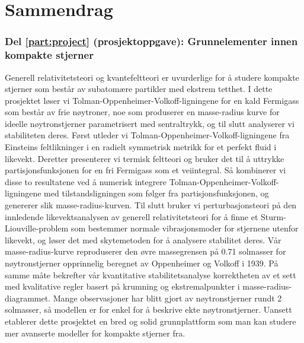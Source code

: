 \chapter*{Sammendrag}%

\subsection*{Del \ref{part:project} (prosjektoppgave): Grunnelementer innen kompakte stjerner}

Generell relativitetsteori og kvantefeltteori er uvurderlige for å studere kompakte stjerner som består av subatomære partikler med ekstrem tetthet.
I dette prosjektet løser vi Tolman-Oppenheimer-Volkoff-ligningene for en kald Fermigass som består av frie nøytroner,
noe som produserer en masse-radius kurve for ideelle nøytronstjerner parametrisert med sentraltrykk,
og til slutt analyserer vi stabiliteten deres.
Først utleder vi Tolman-Oppenheimer-Volkoff-ligningene fra Einsteins feltlikninger
i en radielt symmetrisk metrikk for et perfekt fluid i likevekt.
Deretter presenterer vi termisk feltteori og bruker det
til å uttrykke partisjonsfunksjonen for en fri Fermigass som et veiintegral.
Så kombinerer vi disse to resultatene ved å numerisk integrere Tolman-Oppenheimer-Volkoff-ligningene
med tilstandsligningen som følger fra partisjonsfunksjonen, og genererer slik masse-radius-kurven.
Til slutt bruker vi perturbasjonsteori på den innledende likevektsanalysen av generell relativitetsteori
for å finne et Sturm-Liouville-problem som bestemmer normale vibrasjonsmoder for stjernene utenfor likevekt,
og løser det med skytemetoden for å analysere stabilitet deres.
Vår masse-radius-kurve reproduserer den øvre massegrensen på 0.71 solmasser
for nøytronstjerner opprinnelig beregnet av Oppenheimer og Volkoff i 1939.
På samme måte bekrefter vår kvantitative stabilitetsanalyse korrektheten
av et sett med kvalitative regler basert på krumning og ekstremalpunkter i masse-radius-diagrammet.
Mange observasjoner har blitt gjort av nøytronstjerner rundt 2 solmasser,
så modellen er for enkel for å beskrive ekte nøytronstjerner.
Uansett etablerer dette prosjektet en bred og solid grunnplattform
som man kan studere mer avanserte modeller for kompakte stjerner fra.

\subsection*{}


